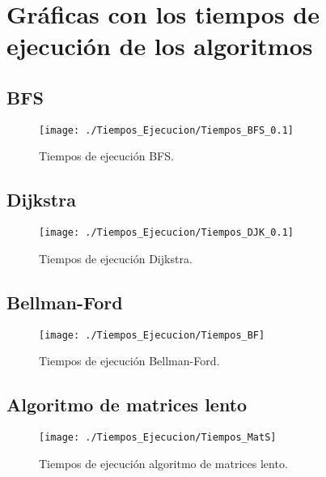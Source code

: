 
\chapter{Gráficas con los tiempos de ejecución de los algoritmos}\label{ap:apendice2}

\section{BFS}

\begin{figure}[!htb]
	\centering
	\texttt{[image: ./Tiempos\_Ejecucion/Tiempos\_BFS\_0.1]}
	
	\caption{Tiempos de ejecución BFS.}
	\label{fig:tiempos_BFS}
\end{figure}

\section{Dijkstra}

\begin{figure}[!htb]
	\centering
	\texttt{[image: ./Tiempos\_Ejecucion/Tiempos\_DJK\_0.1]}
	
	\caption{Tiempos de ejecución Dijkstra.}
	\label{fig:tiempos_DJK}
\end{figure}

\section{Bellman-Ford}

\begin{figure}[!htb]
	\centering
	\texttt{[image: ./Tiempos\_Ejecucion/Tiempos\_BF]}
	
	\caption{Tiempos de ejecución Bellman-Ford.}
	\label{fig:tiempos_BF}
\end{figure}

\section{Algoritmo de matrices lento}

\begin{figure}[!htb]
	\centering
	\texttt{[image: ./Tiempos\_Ejecucion/Tiempos\_MatS]}
	
	\caption{Tiempos de ejecución algoritmo de matrices lento.}
	\label{fig:tiempos_MatS}
\end{figure}

